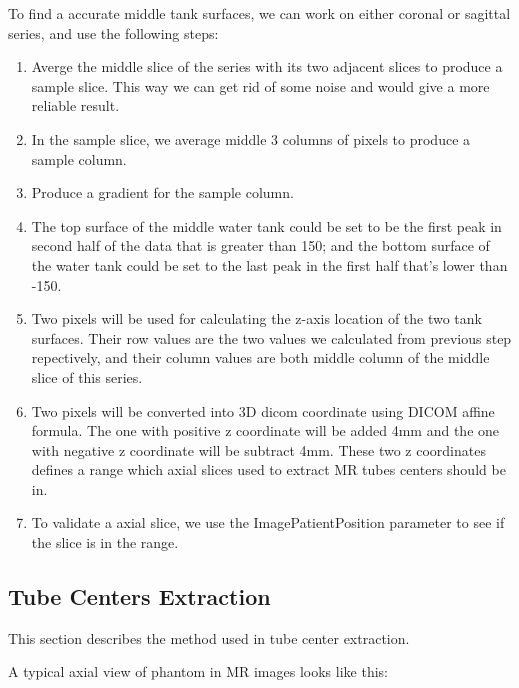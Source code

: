 To find a accurate middle tank surfaces, we can work on either coronal or sagittal series, and use the
following steps:

\begin{enumerate}
\item Averge the middle slice of the series with its two adjacent slices to produce a sample slice. This 
  way we can get rid of some noise and would give a more reliable result.
\item In the sample slice, we average middle 3 columns of pixels to produce a sample column.
\item Produce a gradient for the sample column. 
\item The top surface of the middle water tank could be set to be the first peak in second half 
  of the data that is greater than 150; and the bottom surface of the water tank could be set to the 
  last peak in the first half that's lower than -150. 
\item Two pixels will be used for calculating the z-axis location of the two tank surfaces. Their row
  values are the two values we calculated from previous step repectively, and their column values are both
  middle column of the middle slice of this series.
\item Two pixels will be converted into 3D dicom coordinate using DICOM affine formula. The one with positive
  z coordinate will be added 4mm and the one with negative z coordinate will be subtract 4mm. These two 
  z coordinates defines a range which axial slices used to extract MR tubes centers should be in.
\item To validate a axial slice, we use the ImagePatientPosition parameter to see if the slice is in the range.
\end{enumerate}

\subsection{Tube Centers Extraction}
This section describes the method used in tube center extraction.

A typical axial view of phantom in MR images looks like this:

